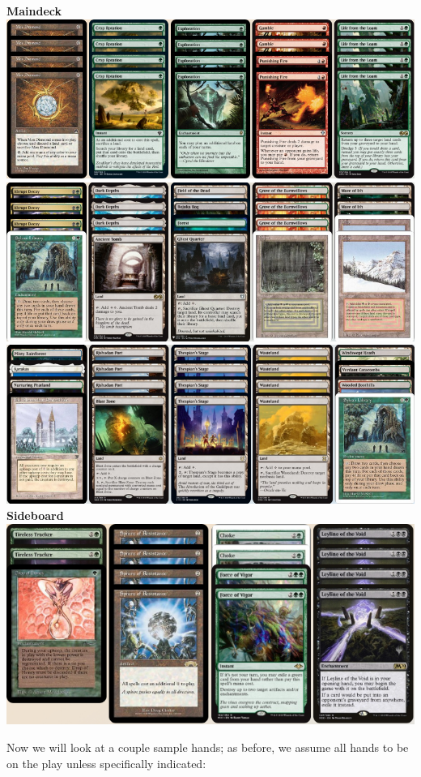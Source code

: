 \documentclass{report}
\begin{document}
\begin{center}
\textbf{Maindeck\\}
\includegraphics [width =\textwidth] {jundlands1}
\includegraphics [width =\textwidth] {jundlands2}
\includegraphics [width =\textwidth] {jundlands3}
\textbf{Sideboard}
\includegraphics [width =\textwidth] {jundlandssb}
\end{center}
Now we will look at a couple sample hands; as before, we assume all hands to be on the play unless specifically indicated:\\
\end{document}
